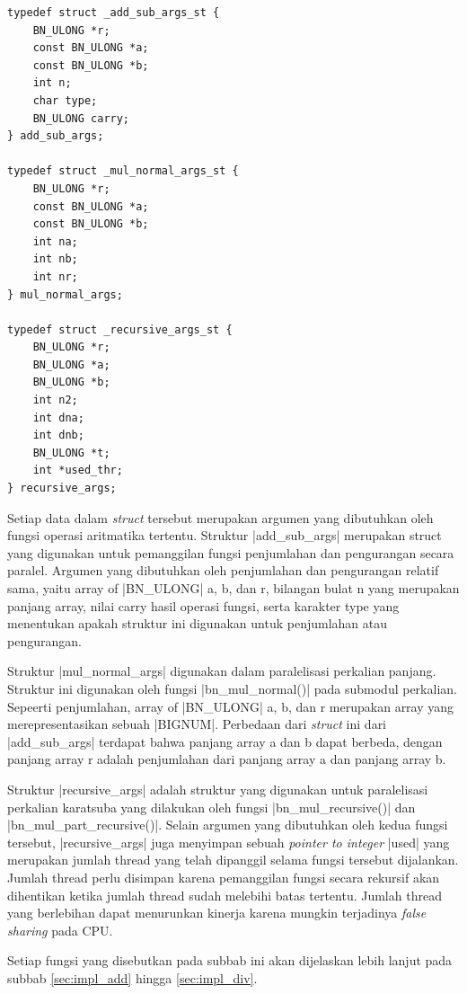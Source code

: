    \begin{lstlisting}[caption={Struktur Data Paralelisasi}, label={code:parallel_struct}]
typedef struct _add_sub_args_st {
    BN_ULONG *r;
    const BN_ULONG *a;
    const BN_ULONG *b;
    int n;
    char type;
    BN_ULONG carry;
} add_sub_args;

typedef struct _mul_normal_args_st {
    BN_ULONG *r;
    const BN_ULONG *a;
    const BN_ULONG *b;
    int na;
    int nb;
    int nr;
} mul_normal_args;

typedef struct _recursive_args_st {
    BN_ULONG *r;
    BN_ULONG *a;
    BN_ULONG *b;
    int n2;
    int dna;
    int dnb;
    BN_ULONG *t;
    int *used_thr;
} recursive_args;
    \end{lstlisting}

    Setiap data dalam \textit{struct} tersebut merupakan argumen yang dibutuhkan oleh fungsi operasi aritmatika tertentu. Struktur |add_sub_args| merupakan struct yang digunakan untuk pemanggilan fungsi penjumlahan dan pengurangan secara paralel. Argumen yang dibutuhkan oleh penjumlahan dan pengurangan relatif sama, yaitu array of |BN_ULONG| a, b, dan r, bilangan bulat n yang merupakan panjang array, nilai carry hasil operasi fungsi, serta karakter type yang menentukan apakah struktur ini digunakan untuk penjumlahan atau pengurangan.

    Struktur |mul_normal_args| digunakan dalam paralelisasi perkalian panjang. Struktur ini digunakan oleh fungsi |bn_mul_normal()| pada submodul perkalian. Sepeerti penjumlahan, array of |BN_ULONG| a, b, dan r merupakan array yang merepresentasikan sebuah |BIGNUM|. Perbedaan dari \textit{struct} ini dari |add_sub_args| terdapat bahwa panjang array a dan b dapat berbeda, dengan panjang array r adalah penjumlahan dari panjang array a dan panjang array b.

    Struktur |recursive_args| adalah struktur yang digunakan untuk paralelisasi perkalian karatsuba yang dilakukan oleh fungsi |bn_mul_recursive()| dan |bn_mul_part_recursive()|. Selain argumen yang dibutuhkan oleh kedua fungsi tersebut, |recursive_args| juga menyimpan sebuah \textit{pointer to integer} |used| yang merupakan jumlah thread yang telah dipanggil selama fungsi tersebut dijalankan. Jumlah thread perlu disimpan karena pemanggilan fungsi secara rekursif akan dihentikan ketika jumlah thread sudah melebihi batas tertentu. Jumlah thread yang berlebihan dapat menurunkan kinerja karena mungkin terjadinya \textit{false sharing} pada CPU.

    Setiap fungsi yang disebutkan pada subbab ini akan dijelaskan lebih lanjut pada subbab \ref{sec:impl_add} hingga \ref{sec:impl_div}.

